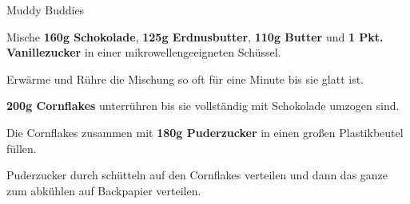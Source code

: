 \begin{recipe}[]{Muddy Buddies} %


\step
Mische \textbf{160g Schokolade}, \textbf{125g Erdnusbutter}, \textbf{110g Butter} und \textbf{1 Pkt. Vanillezucker} in einer mikrowellengeeigneten Schüssel.

\step
Erwärme und Rühre die Mischung so oft für eine Minute bis sie glatt ist.

\step
\textbf{200g Cornflakes} unterrühren bis sie vollständig mit Schokolade umzogen sind.

\step
Die Cornflakes zusammen mit \textbf{180g Puderzucker} in einen großen Plastikbeutel füllen.

\step
Puderzucker durch schütteln auf den Cornflakes verteilen und dann das ganze zum abkühlen auf Backpapier verteilen.

\end{recipe}